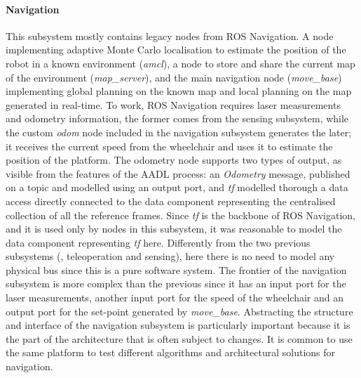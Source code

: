 \paragraph{Navigation} This subsystem mostly contains legacy nodes from ROS Navigation. A node implementing adaptive Monte Carlo localisation to estimate the position of the robot in a known environment (\textit{amcl}), a node to store and share the current map of the environment (\textit{map\_server}), and the main navigation node (\textit{move\_base}) implementing global planning on the known map and local planning on the map generated in real-time. To work, ROS Navigation requires laser measurements and odometry information, the former comes from the sensing subsystem, while the custom \textit{odom} node included in the navigation subsystem generates the later; it receives the current speed from the wheelchair and uses it to estimate the position of the platform. The odometry node supports two types of output, as visible from the features of the AADL process: an \textit{Odometry} message, published on a topic and modelled using an output port, and \textit{tf} modelled thorough a data access directly connected to the data component representing the centralised collection of all the reference frames. Since \textit{tf} is the backbone of ROS Navigation, and it is used only by nodes in this subsystem, it was reasonable to model the data component representing \textit{tf} here. Differently from the two previous subsystems (\ie, teleoperation and sensing), here there is no need to model any physical bus since this is a pure software system. The frontier of the navigation subsystem is more complex than the previous since it has an input port for the laser measurements, another input port for the speed of the wheelchair and an output port for the set-point generated by \textit{move\_base}. Abstracting the structure and interface of the navigation subsystem is particularly important because it is the part of the architecture that is often subject to changes. It is common to use the same platform to test different algorithms and architectural solutions for navigation.


